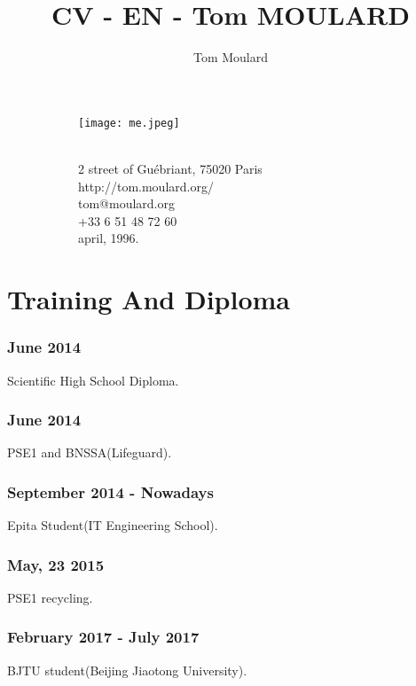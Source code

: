 \documentclass{article}
\begin{document}
    \title{CV - EN - Tom MOULARD}

    \author{Tom Moulard}


    \begin{center}
        \begin{figure}
            \centering
            \begin{subfigure}[b]{0.3\textwidth}
                \texttt{[image: me.jpeg]}
            \end{subfigure}
            \begin{subfigure}[b]{0.3\textwidth}
                {\huge\bfseries\theauthor}\\
                \vspace{.25em}
                2 street of Gu\'ebriant, 75020 Paris\\
                http://tom.moulard.org/\\
                tom@moulard.org\\
                +33 6 51 48 72 60\\
                april,  1996.
            \end{subfigure}
        \end{figure}
    \end{center}

    \section{Training And Diploma}
        \subsubsection{June 2014}
            Scientific High School Diploma.
        \subsubsection{June 2014}
            PSE1 and BNSSA(Lifeguard).
        \subsubsection{September 2014 - Nowadays}
            Epita Student(IT Engineering School).
        \subsubsection{May, 23 2015}
            PSE1 recycling.
        \subsubsection{February 2017 - July 2017}
            BJTU student(Beijing Jiaotong University).
\end{document}
